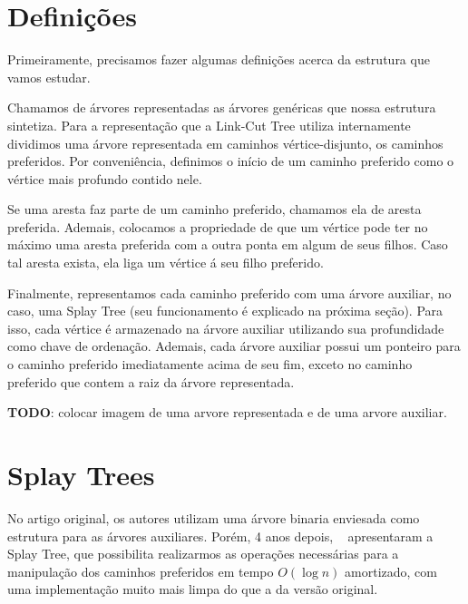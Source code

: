 \section{Definições}
\label{sec:lct-definicoes}

Primeiramente, precisamos fazer algumas definições acerca da estrutura que vamos estudar.

Chamamos de árvores representadas as árvores genéricas que nossa estrutura sintetiza. Para a representação que a Link-Cut Tree utiliza internamente dividimos uma árvore representada em caminhos vértice-disjunto, os caminhos preferidos. Por conveniência, definimos o início de um caminho preferido como o vértice mais profundo contido nele.

Se uma aresta faz parte de um caminho preferido, chamamos ela de aresta preferida. Ademais, colocamos a propriedade de que um vértice pode ter no máximo uma aresta preferida com a outra ponta em algum de seus filhos. Caso tal aresta exista, ela liga um vértice á seu filho preferido.

Finalmente, representamos cada caminho preferido com uma árvore auxiliar, no caso, uma Splay Tree (seu funcionamento é explicado na próxima seção). Para isso, cada vértice é armazenado na árvore auxiliar utilizando sua profundidade como chave de ordenação. Ademais, cada árvore auxiliar possui um ponteiro para o caminho preferido imediatamente acima de seu fim, exceto no caminho preferido que contem a raiz da árvore representada.

\begin{center}
    \textbf{TODO}: colocar imagem de uma arvore representada e de uma arvore auxiliar.
\end{center}

\section{Splay Trees}
\label{sec:lct-splay-trees}

No artigo original, os autores utilizam uma árvore binaria enviesada como estrutura para as árvores auxiliares. Porém, 4 anos depois, ~\citet{10.1145/3828.3835} apresentaram a Splay Tree, que possibilita realizarmos as operações necessárias para a manipulação dos caminhos preferidos em tempo $O(\log n)$ amortizado, com uma implementação muito mais limpa do que a da versão original.

